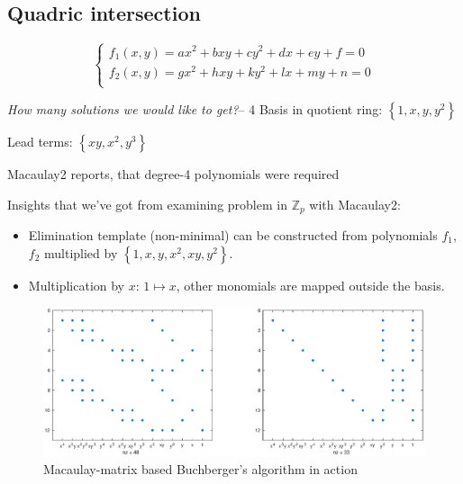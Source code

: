 \subsection{Quadric intersection}
\begin{frame}
    $$
    \begin{cases}
        f_1(x,y)=ax^2+bxy+cy^2+dx+ey+f =0 \\
        f_2(x,y)=gx^2+hxy+ky^2+lx+my+n = 0 \\
    \end{cases}
    $$

    \textit{How many solutions we would like to get?}\pause -- 4
    \pause
    Basis in quotient ring: $\left\{1,x,y,y^2\right\}$

    Lead terms: $\left\{xy, x^2, y^3\right\}$

    Macaulay2 reports, that degree-4 polynomials were required
\end{frame}

\begin{frame}
    Insights that we've got from examining problem in $\mathbb{Z}_p$ with  Macaulay2:
    \begin{itemize}
        \item Elimination template (non-minimal) can be constructed from polynomials $f_1$, $f_2$ multiplied by $\left\{1,x,y,x^2,xy,y^2\right\}$.
    
        \item Multiplication by $x$: $1\mapsto x$, other monomials are mapped outside the basis.
    \end{itemize}
\end{frame}

\begin{frame}
    \begin{figure}
        \includegraphics[width=1.\textwidth]{sections/quad_templates.eps}
        \caption{Macaulay-matrix based Buchberger's algorithm in action}
    \end{figure}
\end{frame}


